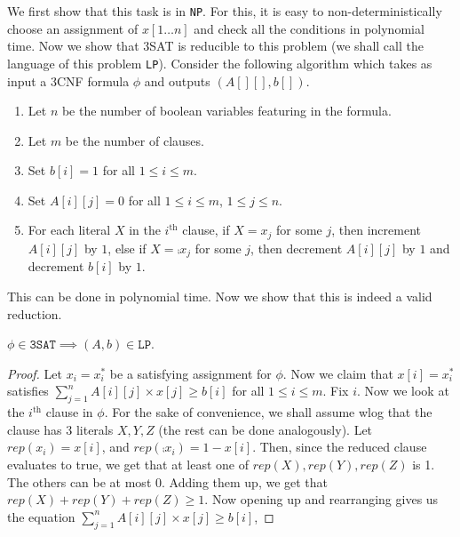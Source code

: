 \begin{soln}
    We first show that this task is in \texttt{NP}. For this, it is easy to non-deterministically choose an assignment of $x[1\ldots n]$ and check all the conditions in
    polynomial time.\nl
    Now we show that 3SAT is reducible to this problem (we shall call the language of this problem \texttt{LP}).\nl
    Consider the following algorithm which takes as input a 3CNF formula $\phi$ and outputs $(A[][], b[])$.
    \begin{enumerate}
        \item Let $n$ be the number of boolean variables featuring in the formula.
        \item Let $m$ be the number of clauses.
        \item Set $b[i] = 1$ for all $1 \le i \le m$.
        \item Set $A[i][j] = 0$ for all $1 \le i \le m$, $1 \le j \le n$.
        \item For each literal $X$ in the $i^\mathrm{th}$ clause, if $X = x_j$ for some $j$, then increment $A[i][j]$ by $1$, else if $X = \comp{x_j}$ for some $j$, then decrement $A[i][j]$
            by $1$ and decrement $b[i]$ by $1$.
    \end{enumerate}
    This can be done in polynomial time. Now we show that this is indeed a valid reduction.\nl
    \begin{claim}
        $\phi \in \texttt{3SAT} \implies (A, b) \in \texttt{LP}$.
    \end{claim}
    \begin{proof}
        Let $x_i = x_i^*$ be a satisfying assignment for $\phi$. Now we claim that $x[i] = x_i^*$ satisfies $\sum_{j = 1}^n A[i][j]
        \times x[j] \ge b[i]$ for all $1 \le i \le m$.\nl
        Fix $i$. Now we look at the $i^\mathrm{th}$ clause in $\phi$. For the sake of convenience, we shall assume wlog that the clause has 3 literals $X, Y, Z$ (the rest can be done
        analogously). Let $rep(x_i) = x[i]$, and $rep(\comp{x_i}) = 1 - x[i]$. Then, since the reduced clause evaluates to true, we get that at least one of $rep(X), rep(Y), rep(Z)$ is 1. The
        others can be at most 0. Adding them up, we get that $rep(X) + rep(Y) + rep(Z) \ge 1$. Now opening up and rearranging gives us the equation $\sum_{j=1}^n A[i][j] \times x[j] \ge b[i]$,

\end{proof}
\end{soln}
